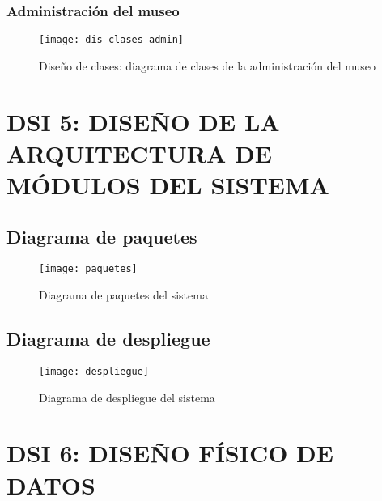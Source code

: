\subsubsection{Administración del museo}
\begin{figure}[H]
\centering
\centerline{\texttt{[image: dis-clases-admin]}}
\caption{Diseño de clases: diagrama de clases de la administración del museo}
\end{figure}

\newpage
\section{DSI 5: DISEÑO DE LA ARQUITECTURA DE MÓDULOS DEL SISTEMA}

\subsection{Diagrama de paquetes}
\begin{figure}[H]
\centering
\centerline{\texttt{[image: paquetes]}}
\caption{Diagrama de paquetes del sistema}
\end{figure}


\subsection{Diagrama de despliegue}
\begin{figure}[H]
\centering
\centerline{\texttt{[image: despliegue]}}
\caption{Diagrama de despliegue del sistema}
\end{figure}


\newpage
\section{DSI 6: DISEÑO FÍSICO DE DATOS}

